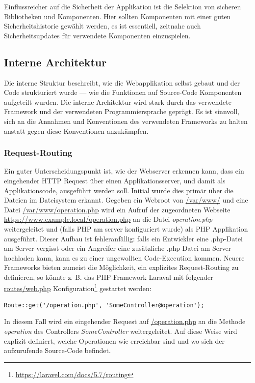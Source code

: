 Einflussreicher auf die Sicherheit der Applikation ist die Selektion von sicheren Bibliotheken und Komponenten. Hier sollten Komponenten mit einer guten Sicherheitshistorie gewählt werden, es ist essentiell, zeitnahe auch Sicherheitsupdates für verwendete Komponenten einzuspielen.

\subsection{Interne Architektur}

Die interne Struktur beschreibt, wie die Webapplikation selbst gebaut und der Code strukturiert wurde --- wie die Funktionen auf Source-Code Komponenten aufgeteilt wurden. Die interne Architektur wird stark durch das verwendete Framework und der verwendeten Programmiersprache geprägt. Es ist sinnvoll, sich an die Annahmen und Konventionen des verwendeten Frameworks zu halten anstatt gegen diese Konventionen anzukämpfen.

\subsubsection{Request-Routing}

Ein guter Unterscheidungspunkt ist, wie der Webserver erkennen kann, dass ein eingehender HTTP Request über einen Applikationsserver, und damit als Applikationscode, ausgeführt werden soll. Initial wurde dies primär über die Dateien im Dateisystem erkannt. Gegeben ein Webroot von \url{/var/www/} und eine Datei \url{/var/www/operation.php} wird ein Aufruf der zugeordneten Webseite \url{https://www.example.local/operation.php} an die Datei \textit{operation.php} weitergeleitet und (falls PHP am server konfiguriert wurde) als PHP Applikation ausgeführt. Dieser Aufbau ist fehleranfällig: falls ein Entwickler eine .php-Datei am Server vergisst oder ein Angreifer eine zusätzliche .php-Datei am Server hochladen kann, kann es zu einer ungewollten Code-Execution kommen. Neuere Frameworks bieten zumeist die Möglichkeit, ein explizites Request-Routing zu definieren, so könnte z. B. das PHP-Framework Laraval mit folgender \url{routes/web.php} Konfiguration\footnote{\url{https://laravel.com/docs/5.7/routing}} gestartet werden:

\begin{verbatim}
Route::get('/operation.php', 'SomeController@operation');
\end{verbatim}

In diesem Fall wird ein eingehender Request auf \url{/operation.php} an die Methode \textit{operation} des Controllers \textit{SomeController} weitergeleitet. Auf diese Weise wird explizit definiert, welche Operationen wie erreichbar sind und wo sich der aufzurufende Source-Code befindet.

